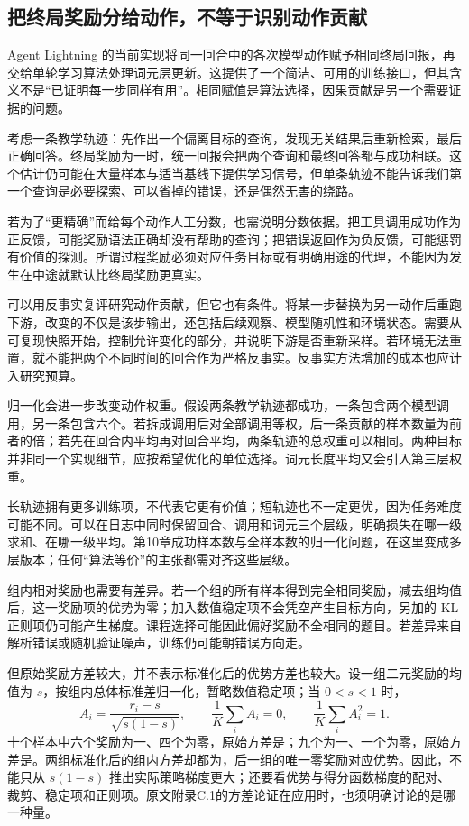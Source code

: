 \subsection{把终局奖励分给动作，不等于识别动作贡献}
\label{sec:ch11-credit}

Agent Lightning 的当前实现将同一回合中的各次模型动作赋予相同终局回报，再交给单轮学习算法处理词元层更新\cite{agent-lightning-2508}。这提供了一个简洁、可用的训练接口，但其含义不是“已证明每一步同样有用”。相同赋值是算法选择，因果贡献是另一个需要证据的问题。

考虑一条教学轨迹：先作出一个偏离目标的查询，发现无关结果后重新检索，最后正确回答。终局奖励为一时，统一回报会把两个查询和最终回答都与成功相联。这个估计仍可能在大量样本与适当基线下提供学习信号，但单条轨迹不能告诉我们第一个查询是必要探索、可以省掉的错误，还是偶然无害的绕路。

若为了“更精确”而给每个动作人工分数，也需说明分数依据。把工具调用成功作为正反馈，可能奖励语法正确却没有帮助的查询；把错误返回作为负反馈，可能惩罚有价值的探测。所谓过程奖励必须对应任务目标或有明确用途的代理，不能因为发生在中途就默认比终局奖励更真实。

可以用反事实复评研究动作贡献，但它也有条件。将某一步替换为另一动作后重跑下游，改变的不仅是该步输出，还包括后续观察、模型随机性和环境状态。需要从可复现快照开始，控制允许变化的部分，并说明下游是否重新采样。若环境无法重置，就不能把两个不同时间的回合作为严格反事实。反事实方法增加的成本也应计入研究预算。

归一化会进一步改变动作权重。假设两条教学轨迹都成功，一条包含两个模型调用，另一条包含六个。若拆成调用后对全部调用等权，后一条贡献的样本数量为前者的倍；若先在回合内平均再对回合平均，两条轨迹的总权重可以相同。两种目标并非同一个实现细节，应按希望优化的单位选择。词元长度平均又会引入第三层权重。

长轨迹拥有更多训练项，不代表它更有价值；短轨迹也不一定更优，因为任务难度可能不同。可以在日志中同时保留回合、调用和词元三个层级，明确损失在哪一级求和、在哪一级平均。第10章成功样本数与全样本数的归一化问题，在这里变成多层版本；任何“算法等价”的主张都需对齐这些层级。

组内相对奖励也需要有差异。若一个组的所有样本得到完全相同奖励，减去组均值后，这一奖励项的优势为零；加入数值稳定项不会凭空产生目标方向，另加的 KL 正则项仍可能产生梯度。课程选择可能因此偏好奖励不全相同的题目。若差异来自解析错误或随机验证噪声，训练仍可能朝错误方向走。

但原始奖励方差较大，并不表示标准化后的优势方差也较大。设一组二元奖励的均值为 $s$，按组内总体标准差归一化，暂略数值稳定项；当 $0<s<1$ 时，
\begin{equation}
 A_i=\frac{r_i-s}{\sqrt{s(1-s)}},\qquad
 \frac1K\sum_i A_i=0,\qquad \frac1K\sum_i A_i^2=1.
 \label{eq:ch11-normalized-advantage}
\end{equation}
十个样本中六个奖励为一、四个为零，原始方差是；九个为一、一个为零，原始方差是。两组标准化后的组内方差却都为，后一组的唯一零奖励对应优势。因此，不能只从 $s(1-s)$ 推出实际策略梯度更大；还要看优势与得分函数梯度的配对、裁剪、稳定项和正则项。原文附录C.1的方差论证\cite{ttcs-2601}在应用时，也须明确讨论的是哪一种量。

